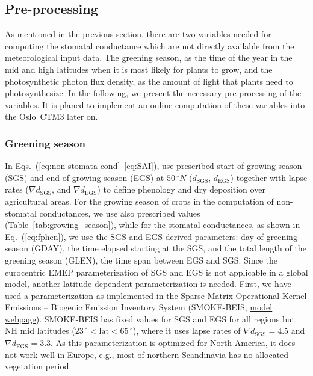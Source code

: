 \documentclass[gmd, manuscript]{copernicus}
\begin{document}
\subsection{Pre-processing}
\label{subsec:pre-pro}
As mentioned in the previous section, there are two variables needed for computing the stomatal conductance which are not directly available from the meteorological input data. The greening season, as the time of the year in the mid and high latitudes when it is most likely for plants to grow, and the photosynthetic photon flux density, as the amount of light that plants need to photosynthesize. In the following, we present the necessary pre-processing of the variables. It is planed to implement an online computation of these variables into the Oslo~CTM3 later on.
\subsubsection{Greening season}
\label{subsubsec:greening}
In Eqs.~(\ref{eq:non-stomata-cond}--\ref{eq:SAI}), \citet{ACP:Simpson2012} use prescribed start of growing season (SGS) and end of growing season (EGS) at $50\,\unit{^\circ N}$ ($d_\text{SGS}$, $d_\text{EGS}$) together with lapse rates ($\nabla d_\text{SGS}$, and $\nabla d_\text{EGS}$) to define phenology and dry deposition over agricultural areas. For the growing season of crops in the computation of non-stomatal conductances, we use also prescribed values (Table~\ref{tab:growing_season}), while for the stomatal conductances, as shown in Eq.~(\ref{eq:fphen}), we use the SGS and EGS derived parameters: day of greening season (GDAY), the time elapsed starting at the SGS, and the total length of the greening season (GLEN), the time span between EGS and SGS. Since the eurocentric EMEP parameterization of SGS and EGS is not applicable in a global model, another latitude dependent parameterization is needed. First, we have used a parameterization as implemented in the Sparse Matrix Operational Kernel Emissions -- Biogenic Emission Inventory System (SMOKE-BEIS; \href{https://www.epa.gov/air-emissions-modeling/biogenic-emission-inventory-system-beis}{model webpage}). SMOKE-BEIS has fixed values for SGS and EGS for all regions but NH mid latitudes ($23\,\unit{^\circ} < \text{lat} < 65\,\unit{^\circ}$), where it uses lapse rates of $\nabla d_\text{SGS} = 4.5$ and $\nabla d_\text{EGS} = 3.3$. As this parameterization is optimized for North America, it does not work well in Europe, e.g., most of northern Scandinavia has no allocated vegetation period.\\ 
\end{document}
